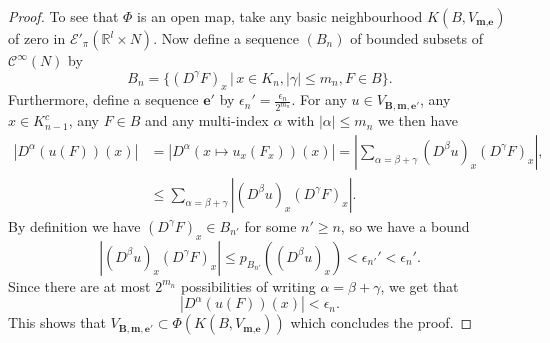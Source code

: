 \documentclass[10pt,a4paper]{amsart}
\newcommand{\C}{\mathord{\mathcal{C}^{\infty}}}
\newcommand{\RR}{\mathbb{R}}
\newcommand{\cE}{\mathcal{E}}
\begin{document}
\begin{proof}
To see that $\Phi$ is an open map, take any basic neighbourhood $K(B,V_{\textbf{m},\textbf{e}})$ of zero
in $\cE'_{\pi}(\RR^{l}\times N)$. Now define a sequence $(B_{n})$ of bounded subsets of $\C(N)$ by
\[
B_{n}=\{(D^{\gamma}F)_{x}\,|\,x\in K_{n},|\gamma|\leq m_{n},F\in B\}.
\]
Furthermore, define a sequence $\textbf{e}'$ by $\epsilon_{n}'=\frac{\epsilon_{n}}{2^{m_{n}}}$. For any 
$u\in V_{\textbf{B},\textbf{m},\textbf{e}'}$, any $x\in K_{n-1}^{c}$, any $F\in B$ and any multi-index $\alpha$ 
with $|\alpha|\leq m_{n}$ we then have
\begin{align*}
|D^{\alpha}(u(F))(x)|&=|D^{\alpha}(x\mapsto u_{x}(F_{x}))(x)|
=\left|\sum_{\alpha=\beta+\gamma}(D^{\beta}u)_{x}(D^{\gamma}F)_{x}\right|, \\
&\leq \sum_{\alpha=\beta+\gamma}|(D^{\beta}u)_{x}(D^{\gamma}F)_{x}|.
\end{align*}
By definition we have $(D^{\gamma}F)_{x}\in B_{n'}$ for some $n'\geq n$, so we have a bound 
\[
|(D^{\beta}u)_{x}(D^{\gamma}F)_{x}|\leq p_{B_{n'}}((D^{\beta}u)_{x})<\epsilon_{n'}'<\epsilon_{n}'.
\]
Since there are at most $2^{m_{n}}$ possibilities of writing $\alpha=\beta+\gamma$, we get that
\[
|D^{\alpha}(u(F))(x)|<\epsilon_{n}.
\]
This shows that $V_{\textbf{B},\textbf{m},\textbf{e}'}\subset\Phi(K(B,V_{\textbf{m},\textbf{e}}))$ which concludes the proof.
\end{proof}
\end{document}

